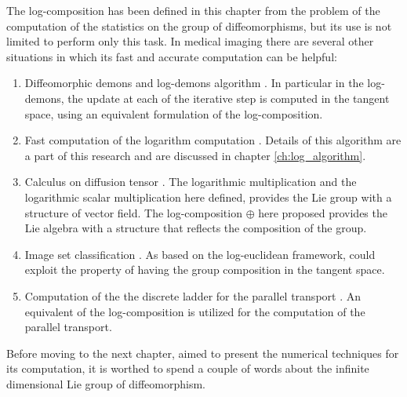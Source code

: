The log-composition has been defined in this chapter from the problem of the computation of the statistics on the group of diffeomorphisms, but its use is not limited to perform only this task.
In medical imaging there are several other situations in which its fast and accurate computation can be helpful:
\begin{enumerate}
	\item Diffeomorphic demons \cite{vercauteren2007non} and log-demons algorithm \cite{vercauteren08}. In particular in the log-demons, the update at each of the iterative step is computed in the tangent space, using an equivalent formulation of the log-composition. 
	\item Fast computation of the logarithm computation \cite{Bossa:08}. Details of this algorithm are a part of this research and are discussed in chapter \ref{ch:log_algorithm}.
	\item Calculus on diffusion tensor \cite{Arsigny:MRM:06}. The logarithmic multiplication and the logarithmic scalar multiplication here defined, provides the Lie group with a structure of vector field. The log-composition $\oplus$ here proposed provides the Lie algebra with a structure that reflects the composition of the group.  
	\item Image set classification \cite{huanglog}. As based on the log-euclidean framework, could exploit the property of having the group composition in the tangent space.
	\item Computation of the the discrete ladder for the parallel transport \cite{Lorenzi:discrete_ladders:14}. An equivalent of the log-composition is utilized for the computation of the parallel transport.
\end{enumerate}	

Before moving to the next chapter, aimed to present the numerical techniques for its computation, it is worthed to spend a couple of words about the infinite dimensional Lie group of diffeomorphism.


